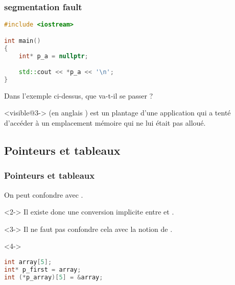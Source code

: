 \documentclass{cppcourses}
\begin{document}
\begin{frame}[fragile]

\frametitle{segmentation fault}

\begin{example}

\begin{lstlisting}[language=c++]
#include <iostream>

int main()
{
    int* p_a = nullptr;

    std::cout << *p_a << '\n';
}
\end{lstlisting}

Dans l'exemple ci-dessus, que va-t-il se passer ?


\end{example}

\begin{definition}<visible@3->
 (en anglais ) est un plantage d'une application qui a tenté d'accéder à un emplacement mémoire qui ne lui était pas alloué.
\end{definition}

\end{frame}

\subsection{Pointeurs et tableaux}

\begin{frame}[fragile]

\frametitle{Pointeurs et tableaux}

On peut confondre  avec .

\begin{remark}<2->
Il existe donc une conversion implicite entre \mykeyword{\textcolor{orange}{<type>}[\textcolor{blue}{<N>}]} et \mykeyword{\textcolor{orange}{<type>}*}.
\end{remark}

\begin{warning}<3->
Il ne faut pas confondre cela avec la notion de .
\end{warning}

\begin{example}<4->

\begin{lstlisting}[language=c++]
int array[5];
int* p_first = array;
int (*p_array)[5] = &array;
\end{lstlisting}

\end{example}

\end{frame}
\end{document}
